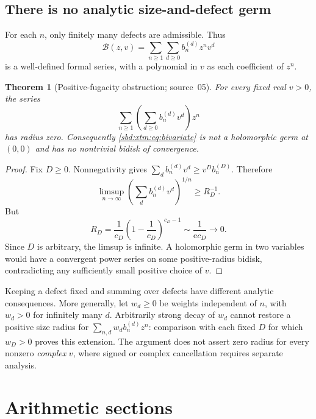 \documentclass[11pt,a4paper]{article}
\newtheorem{theorem}{Theorem}[section]
\theoremstyle{definition}
\newcommand{\e}{\mathrm e}
\begin{document}
\subsection{There is no analytic size-and-defect germ}
For each $n$, only finitely many defects are admissible. Thus
\begin{equation}\label{sbd:xtm:eq:bivariate}
 \mathcal B(z,v)=\sum_{n\ge1}\sum_{d\ge0}b_n^{(d)}z^nv^d
\end{equation}
is a well-defined formal series, with a polynomial in $v$ as each
coefficient of $z^n$.

\begin{theorem}[Positive-fugacity obstruction; source~05]\label{sbd:xtm:thm:bivariate}
For every fixed real $v>0$, the series
\begin{equation}\label{sbd:xtm:eq:positive-fugacity}
 \sum_{n\ge1}\left(\sum_{d\ge0}b_n^{(d)}v^d\right)z^n
\end{equation}
has radius zero. Consequently \eqref{sbd:xtm:eq:bivariate} is not a
holomorphic germ at $(0,0)$ and has no nontrivial bidisk of convergence.
\end{theorem}
\begin{proof}
Fix $D\ge0$. Nonnegativity gives $\sum_db_n^{(d)}v^d\ge v^Db_n^{(D)}$.
Therefore
\[
 \limsup_{n\to\infty}
 \left(\sum_db_n^{(d)}v^d\right)^{1/n}\ge R_D^{-1}.
\]
But
\begin{equation}\label{sbd:xtm:eq:radius-asymptotic}
 R_D=\frac1{c_D}\left(1-\frac1{c_D}\right)^{c_D-1}
 \sim\frac1{\e c_D}\longrightarrow0.
\end{equation}
Since $D$ is arbitrary, the limsup is infinite. A holomorphic germ in two
variables would have a convergent power series on some positive-radius
bidisk, contradicting any sufficiently small positive choice of $v$.
\end{proof}

Keeping a defect fixed and summing over defects have different analytic
consequences. More generally, let $w_d\ge0$ be weights independent of $n$,
with $w_d>0$ for infinitely many $d$. Arbitrarily strong decay of $w_d$
cannot restore a positive size radius for $\sum_{n,d}w_db_n^{(d)}z^n$:
comparison with each fixed $D$ for which $w_D>0$ proves this extension. The
argument does not assert zero radius for every nonzero \emph{complex} $v$,
where signed or complex cancellation requires separate analysis.

\section{Arithmetic sections}
\label{sbd:edge:sec:subsequences}
\end{document}

